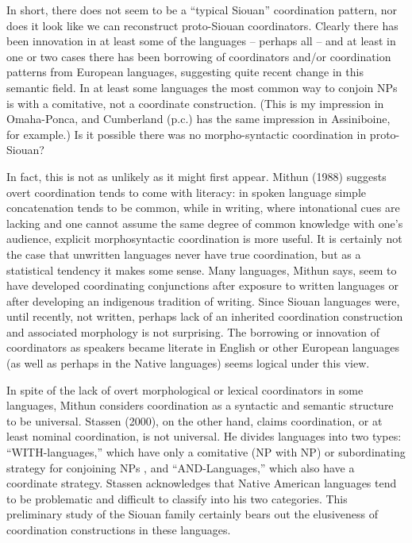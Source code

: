 \documentclass[output=paper]{LSP/langsci}
\begin{document}
In short, there does not seem to be a ``typical Siouan'' coordination pattern, nor does it look like we can reconstruct proto-Siouan coordinators. Clearly there has been innovation in at least some of the languages -- perhaps all -- and at least in one or two cases there has been borrowing of coordinators and/or coordination patterns from European languages, suggesting quite recent change in this semantic field. In at least some languages the most common way to conjoin NPs is with a comitative, not a coordinate construction. (This is my impression in Omaha-Ponca, and Cumberland (p.c.) has the same impression in Assiniboine, for example.) Is it possible there was no morpho-syntactic coordination in proto-Siouan?

In fact, this is not as unlikely as it might first appear. Mithun (1988) suggests overt coordination tends to come with literacy: in spoken language simple concatenation tends to be common, while in writing, where intonational cues are lacking and one cannot assume the same degree of common knowledge with one's audience, explicit morphosyntactic coordination is more useful. It is certainly not the case that unwritten languages never have true coordination, but as a statistical tendency it makes some sense. Many languages, Mithun says, seem to have developed coordinating conjunctions after exposure to written languages or after developing an indigenous tradition of writing. Since Siouan languages were, until recently, not written, perhaps lack of an inherited coordination construction and associated morphology is not surprising. The borrowing or innovation of coordinators as speakers became literate in English or other European languages (as well as perhaps in the Native languages) seems logical under this view.

In spite of the lack of overt morphological or lexical coordinators in some languages, Mithun considers coordination as a syntactic and semantic structure to be universal. Stassen (2000), on the other hand, claims coordination, or at least nominal coordination, is not universal. He divides languages into two types: ``WITH-languages,'' which have only a comitative (NP with NP) or subordinating strategy for conjoining NPs , and ``AND-Languages,'' which also have a coordinate strategy. Stassen acknowledges that Native American languages tend to be problematic and difficult to classify into his two categories. This preliminary study of the Siouan family certainly bears out the elusiveness of coordination constructions in these languages.
\end{document}
